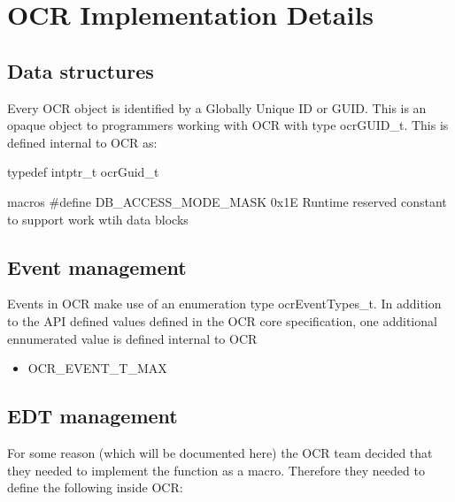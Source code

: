 %

\chapter{OCR Implementation Details}
\label{chap:OCR Implementation Detail}
\label{chap:Appendix C}

\section{Data structures}

Every OCR object is identified by a Globally Unique ID or GUID.  This is an 
opaque object to programmers working with OCR with type ocrGUID\_t.  This
is defined internal to OCR as:

 typedef intptr\_t ocrGuid\_t

macros
\#define DB\_ACCESS\_MODE\_MASK 0x1E Runtime reserved constant to support 
work wtih data blocks

\section{Event management}

Events in OCR make use of an enumeration type ocrEventTypes\_t.
In addition to the API defined values defined in the OCR core specification,
one additional ennumerated value is defined internal to OCR
\begin{itemize}

\item OCR\_EVENT\_T\_MAX

\end{itemize}

\section{EDT management}

For some reason (which will be documented here) the OCR team decided that they needed
to implement the  function as a macro.  Therefore they 
needed to define the following inside OCR:

